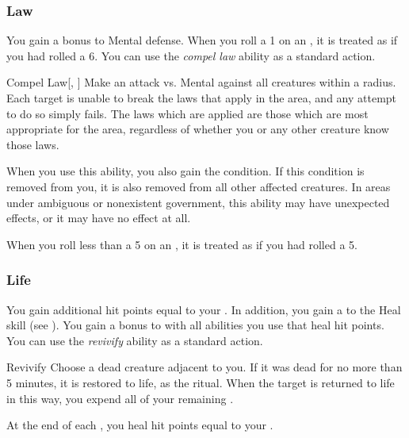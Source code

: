         \subsubsection{Law}
             You gain a  bonus to Mental defense.
             When you roll a 1 on an , it is treated as if you had rolled a 6.
             You can use the \textit{compel law} ability as a standard action.
            \begin{apability}{Compel Law}[, ]
                Make an attack vs. Mental against all creatures within a \arealarge radius.
                \hit Each target is unable to break the laws that apply in the area, and any attempt to do so simply fails.
                The laws which are applied are those which are most appropriate for the area, regardless of whether you or any other creature know those laws.

                When you use this ability, you also gain the condition.
                If this condition is removed from you, it is also removed from all other affected creatures.
                In areas under ambiguous or nonexistent government, this ability may have unexpected effects, or it may have no effect at all.
            \end{apability}
             When you roll less than a 5 on an , it is treated as if you had rolled a 5.

        \subsubsection{Life}
             You gain additional hit points equal to your .
            In addition, you gain a   to the Heal skill (see ).
             You gain a  bonus to  with all abilities you use that heal hit points.
             You can use the \textit{revivify} ability as a standard action.
            \begin{apability}{Revivify}
                Choose a dead creature adjacent to you.
                If it was dead for no more than 5 minutes, it is restored to life, as the  ritual.
                When the target is returned to life in this way, you expend all of your remaining .
            \end{apability}
             At the end of each , you heal hit points equal to your .

